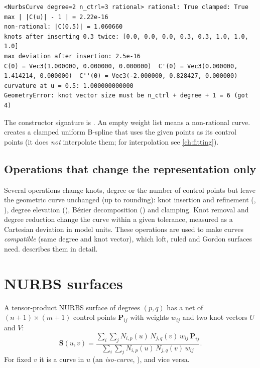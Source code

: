 
\begin{lstlisting}[style=text]
<NurbsCurve degree=2 n_ctrl=3 rational> rational: True clamped: True
max | |C(u)| - 1 | = 2.22e-16
non-rational: |C(0.5)| = 1.060660
knots after inserting 0.3 twice: [0.0, 0.0, 0.0, 0.3, 0.3, 1.0, 1.0, 1.0]
max deviation after insertion: 2.5e-16
C(0) = Vec3(1.000000, 0.000000, 0.000000)  C'(0) = Vec3(0.000000, 1.414214, 0.000000)  C''(0) = Vec3(-2.000000, 0.828427, 0.000000)
curvature at u = 0.5: 1.000000000000
GeometryError: knot vector size must be n_ctrl + degree + 1 = 6 (got 4)
\end{lstlisting}

The constructor signature is
. An empty weight list means a
non-rational curve.  creates a clamped uniform
B-spline that uses the given points as its control points (it does \emph{not} interpolate them;
for interpolation see \cref{ch:fitting}).

\subsection{Operations that change the representation only}
Several operations change knots, degree or the number of control points but leave the geometric
curve unchanged (up to rounding): knot insertion and refinement
(, ), degree elevation
(), Bézier decomposition
() and clamping. Knot removal and degree reduction change the
curve within a given tolerance, measured as a Cartesian deviation in model units. These
operations are used to make curves \emph{compatible} (same degree and knot vector), which loft,
ruled and Gordon surfaces need.  describes them in detail.

\section{NURBS surfaces}\label{sec:concepts-surfaces}

A tensor-product NURBS surface of degrees $(p,q)$ has a net of $(n+1)\times(m+1)$ control points
$\mathbf P_{ij}$ with weights $w_{ij}$ and two knot vectors $U$ and $V$:
\begin{equation}
  \mathbf S(u,v) = \frac{\sum_{i}\sum_{j} N_{i,p}(u)\,N_{j,q}(v)\,w_{ij}\,\mathbf P_{ij}}
                        {\sum_{i}\sum_{j} N_{i,p}(u)\,N_{j,q}(v)\,w_{ij}} .
\end{equation}
For fixed $v$ it is a curve in $u$ (an \emph{iso-curve}, ), and
vice versa.


